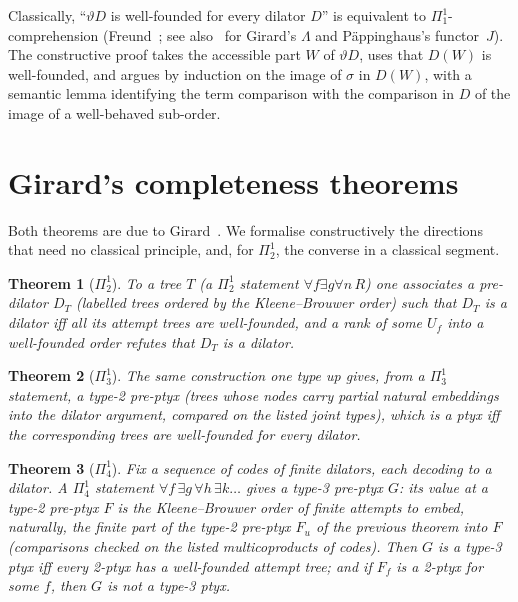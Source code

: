 \documentclass[11pt]{article}
\newtheorem{theorem}{Theorem}[section]
\theoremstyle{definition}
\theoremstyle{remark}
\begin{document}
Classically, ``$\vartheta D$ is well-founded for every dilator $D$'' is
equivalent to $\Pi^1_1$-comprehension (Freund~\cite{Fre19}; see
also~\cite{AFW} for Girard's $\Lambda$ and P\"appinghaus's functor~$J$). The constructive proof
takes the accessible part $W$ of $\vartheta D$, uses that $D(W)$ is
well-founded, and argues by induction on the image of $\sigma$ in $D(W)$,
with a semantic lemma identifying the term comparison with the comparison
in $D$ of the image of a well-behaved sub-order.

\section{Girard's completeness theorems}\label{sec:girard}

Both theorems are due to Girard~\cite{Gir81,GirPTLC}. We formalise
constructively the directions that need no classical principle, and, for
$\Pi^1_2$, the converse in a classical segment.

\begin{theorem}[$\Pi^1_2$]
To a tree $T$ (a $\Pi^1_2$ statement $\forall f\exists g\forall n\,R$)
one associates a pre-dilator $D_T$ (labelled trees ordered by the
Kleene--Brouwer order) such that $D_T$ is a dilator iff all its attempt
trees are well-founded, and a rank of some $U_f$ into a well-founded order
refutes that $D_T$ is a dilator.
\end{theorem}

\begin{theorem}[$\Pi^1_3$]
The same construction one type up gives, from a $\Pi^1_3$ statement, a
type-2 pre-ptyx (trees whose nodes carry partial natural embeddings into
the dilator argument, compared on the listed joint types), which is a ptyx
iff the corresponding trees are well-founded for every dilator.
\end{theorem}

\begin{theorem}[$\Pi^1_4$]
Fix a sequence of codes of finite dilators, each decoding to a dilator. A
$\Pi^1_4$ statement $\forall f\,\exists g\,\forall h\,\exists k\ldots$ gives a
type-3 pre-ptyx $G$: its value at a type-2 pre-ptyx $F$ is the
Kleene--Brouwer order of finite attempts to embed, naturally, the finite
part of the type-2 pre-ptyx $F_u$ of the previous theorem into $F$
(comparisons checked on the listed multicoproducts of codes). Then $G$ is a
type-3 ptyx iff every 2-ptyx has a well-founded attempt tree; and if $F_f$
is a 2-ptyx for some $f$, then $G$ is not a type-3 ptyx.
\end{theorem}
\end{document}
